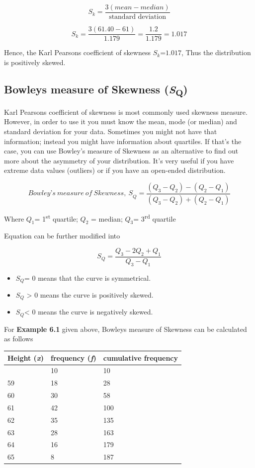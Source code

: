\documentclass[
]{book}
\begin{document}
\[S_{k} = \frac{3(mean - median)}{\text{standard deviation}}\]

\[S_{k} = \frac{3(61.40 - 61)}{1.179} = \frac{1.2}{1.179} = 1.017\]

Hence, the Karl Pearson\textquotesingle s coefficient of skewness \(S_{k}\)=\(1.017\), Thus
the distribution is positively skewed.

\hypertarget{bowleys-measure-of-skewness-sq}{%
\subsection{\texorpdfstring{Bowley\textquotesingle s measure of Skewness (\emph{S}\textsubscript{Q})}{Bowley\textquotesingle s measure of Skewness (SQ)}}\label{bowleys-measure-of-skewness-sq}}

Karl Pearson\textquotesingle s coefficient of skewness is most commonly used skewness
measure. However, in order to use it you must know the mean, mode (or
median) and standard deviation for your data. Sometimes you might not
have that information; instead you might have information about
quartiles. If that's the case, you can use Bowley's measure of Skewness
as an alternative to find out more about the asymmetry of your
distribution. It's very useful if you have extreme data values
(outliers) or if you have an open-ended distribution.

\[{Bowley’s\ measure\ of\ Skewness,\ S}_{Q} = \frac{\left( Q_{3} - Q_{2} \right) - \left( Q_{2} - Q_{1} \right)}{\left( Q_{3} - Q_{2} \right) + \left( Q_{2} - Q_{1} \right)}\]

Where \(Q_{1}\)= 1\textsuperscript{st} quartile; \(Q_{2}\) = median; \(Q_{3}\)= 3\textsuperscript{rd} quartile

Equation can be further modified into

\[S_{Q} = \frac{Q_{3} - 2Q_{2} + Q_{1}}{Q_{3} - Q_{1}}\]

\begin{itemize}
\item
  \(S_{Q}\)= 0 means that the curve is symmetrical.
\item
  \(S_{Q}\) \textgreater{} 0 means the curve is positively skewed.
\item
  \(S_{Q}\)\textless{} 0 means the curve is negatively skewed.
\end{itemize}

For \textbf{Example 6.1} given above, Bowley\textquotesingle s measure of Skewness can be
calculated as follows

\begin{longtable}[]{@{}lll@{}}
\toprule\noalign{}
Height (\emph{x}) & frequency (\emph{f}) & cumulative frequency \\
\midrule\noalign{}
\endhead
\bottomrule\noalign{}
\endlastfoot
58 & 10 & 10 \\
59 & 18 & 28 \\
60 & 30 & 58 \\
61 & 42 & 100 \\
62 & 35 & 135 \\
63 & 28 & 163 \\
64 & 16 & 179 \\
65 & 8 & 187 \\
\end{longtable}
\end{document}
